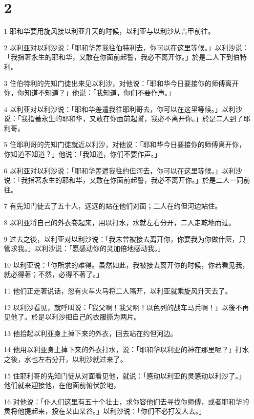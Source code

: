 \chapter{2}

\par 1 耶和华要用旋风接以利亚升天的时候，以利亚与以利沙从吉甲前往。
\par 2 以利亚对以利沙说：「耶和华差我往伯特利去，你可以在这里等候。」以利沙说：「我指著永生的耶和华，又敢在你面前起誓，我必不离开你。」於是二人下到伯特利。
\par 3 住伯特利的先知门徒出来见以利沙，对他说：「耶和华今日要接你的师傅离开你，你知道不知道？」他说：「我知道，你们不要作声。」
\par 4 以利亚对以利沙说：「耶和华差遣我往耶利哥去，你可以在这里等候。」以利沙说：「我指著永生的耶和华，又敢在你面前起誓，我必不离开你。」於是二人到了耶利哥。
\par 5 住耶利哥的先知门徒就近以利沙，对他说：「耶和华今日要接你的师傅离开你，你知道不知道？」他说：「我知道，你们不要作声。」
\par 6 以利亚对以利沙说：「耶和华差遣我往约但河去，你可以在这里等候。」以利沙说：「我指著永生的耶和华，又敢在你面前起誓，我必不离开你。」於是二人一同前往。
\par 7 有先知门徒去了五十人，远远的站在他们对面；二人在约但河边站住。
\par 8 以利亚将自己的外衣卷起来，用以打水，水就左右分开，二人走乾地而过。
\par 9 过去之後，以利亚对以利沙说：「我未曾被接去离开你，你要我为你做什麽，只管求我。」以利沙说：「愿感动你的灵加倍地感动我。」
\par 10 以利亚说：「你所求的难得。虽然如此，我被接去离开你的时候，你若看见我，就必得著；不然，必得不著了。」
\par 11 他们正走著说话，忽有火车火马将二人隔开，以利亚就乘旋风升天去了。
\par 12 以利沙看见，就呼叫说：「我父啊！我父啊！以色列的战车马兵啊！」以後不再见他了。於是以利沙把自己的衣服撕为两片。
\par 13 他拾起以利亚身上掉下来的外衣，回去站在约但河边。
\par 14 他用以利亚身上掉下来的外衣打水，说：「耶和华以利亚的神在那里呢？」打水之後，水也左右分开，以利沙就过来了。
\par 15 住耶利哥的先知门徒从对面看见他，就说：「感动以利亚的灵感动以利沙了。」他们就来迎接他，在他面前俯伏於地，
\par 16 对他说：「仆人们这里有五十个壮士，求你容他们去寻找你师傅，或者耶和华的灵将他提起来，投在某山某谷。」以利沙说：「你们不必打发人去。」
